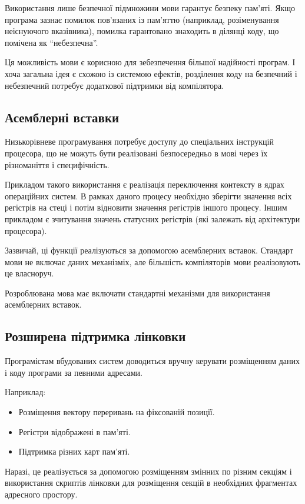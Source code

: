 \documentclass[main.tex]{subfiles}
\begin{document}
Використання лише безпечної підмножини мови гарантує безпеку пам'яті. Якщо програма зазнає помилок пов'язаних із пам'яттю (наприклад, розіменування неіснуючого вказівника), помилка гарантовано знаходить в ділянці коду, що помічена як ``небезпечна''.

Ця можливість мови є корисною для зебезпечення більшої надійності програм. І хоча загальна ідея є схожою із системою ефектів, розділення коду на безпечний і небезпечний потребує додаткової підтримки від компілятора.

\subsection{Асемблерні вставки}
Низькорівневе програмування потребує доступу до спеціальних інструкцій процесора, що не можуть бути реалізовані безпосередньо в мові через їх різноманіття і специфічність.

Прикладом такого використання є реалізація переключення контексту в ядрах операційних систем. В рамках даного процесу необхідно зберігти значення всіх регістрів на стеці і потім відновити значення регістрів іншого процесу.
Іншим прикладом є зчитування значень статусних регістрів (які залежать від архітектури процесора).

Зазвичай, ці функції реалізуються за допомогою асемблерних вставок. Стандарт мови \LangC{} не включає даних механізміх, але більшість компіляторів мови \LangC{} реалізовують це власноруч.

Розроблювана мова має включати стандартні механізми для використання асемблерних вставок.

\subsection{Розширена підтримка лінковки}
Програмістам вбудованих систем доводиться вручну керувати розміщенням даних і коду програми за певними адресами.

Наприклад:
\begin{itemize}[nosep]
\item Розміщення вектору переривань на фіксованій позиції.
\item Регістри відображені в пам'яті.
\item Підтримка різних карт пам'яті.
\end{itemize}

Наразі, це реалізується за допомогою розміщенням змінних по різним секціям і використання скриптів лінковки для розміщення секцій в необхідних фрагментах адресного простору.
\end{document}
